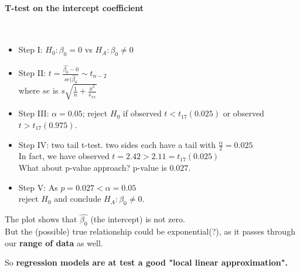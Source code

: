 \documentclass[a4paper, 11pt, twoside]{article}
\begin{document}
\paragraph{T-test on the intercept coefficient}\ \\
\begin{itemize}
	\item Step I: $H_0:\beta_0 = 0$ vs $H_A:\beta_0\not=0$
	\item Step II: $t=\frac{\hat{\beta_0}-0}{se(\hat{\beta_0}}\sim t_{n-2}$\\
	where $se$ is $s\sqrt{\frac1{n}+\frac{\bar{x}^2}{s_{xx}}}$
	\item Step III: $\alpha=0.05$; reject $H_0$ if observed $t < t_{17}(0.025)$ or observed $t > t_{17}(0.975)$.
	\item Step IV: two tail t-test. two sides each have a tail with $\frac{\alpha}{2}=0.025$\\
	In fact, we have observed $t=2.42 > 2.11=t_{17}(0.025)$\\
	What about p-value approach? p-value is $0.027$.
	\item Step V: As $p=0.027 < \alpha = 0.05$\\
	reject $H_0$ and conclude $H_A: \beta_0\not=0.$
\end{itemize}

The plot shows that $\hat{\beta_0}$ (the intercept) is not zero.\\

But the (possible) true relationship could be exponential(?), as it passes through our \textbf{range of data} as well.

So \textbf{regression models are at test a good "local linear approximation".}
\end{document}
